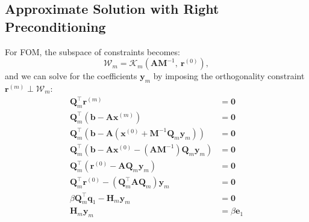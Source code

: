 \documentclass{article}
\begin{document}
\begin{appendix}
    \subsection{Approximate Solution with Right Preconditioning}\label{app:sol-right-precond}
    For FOM, the subspace of constraints becomes:
    \begin{equation*}
        \mathcal{W}_m = \mathcal{K}_m\left( \symbf{A} \symbf{M}^{-1},\: \symbf{r}^{\left( 0 \right)} \right),
    \end{equation*}
    and we can solve for the coefficients \(\symbf{y}_m\) by imposing the
    orthogonality constraint \(\symbf{r}^{\left( m \right)} \perp \mathcal{W}_m\):
    \begin{align*}
        \symbf{Q}_m^\top \symbf{r}^{\left( m \right)}                                                                                                        & = \symbf{0}                           \\
        \symbf{Q}_m^\top \left( \symbf{b} - \symbf{A} \symbf{x}^{\left( m \right)} \right)                                                                   & = \symbf{0}                           \\
        \symbf{Q}_m^\top \left( \symbf{b} - \symbf{A} \left( \symbf{x}^{\left( 0 \right)} + \symbf{M}^{-1} \symbf{Q}_m \symbf{y}_m \right) \right)           & = \symbf{0}                           \\
        \symbf{Q}_m^\top \left( \symbf{b} - \symbf{A} \symbf{x}^{\left( 0 \right)} - \left( \symbf{A} \symbf{M}^{-1} \right) \symbf{Q}_m \symbf{y}_m \right) & = \symbf{0}                           \\
        \symbf{Q}_m^\top \left( \symbf{r}^{\left( 0 \right)} - \symbf{A} \symbf{Q}_m \symbf{y}_m \right)                                                     & = \symbf{0}                           \\
        \symbf{Q}_m^\top \symbf{r}^{\left( 0 \right)} - \left( \symbf{Q}_m^\top \symbf{A} \symbf{Q}_m \right) \symbf{y}_m                                    & = \symbf{0}                           \\
        \beta \symbf{Q}_m^\top \symbf{q}_1 - \symbf{H}_m \symbf{y}_m                                                                                         & = \symbf{0}                           \\
        \symbf{H}_m \symbf{y}_m                                                                                                                              & = \beta \symbf{e}_1                   \\

\end{align*}
\end{appendix}
\end{document}
